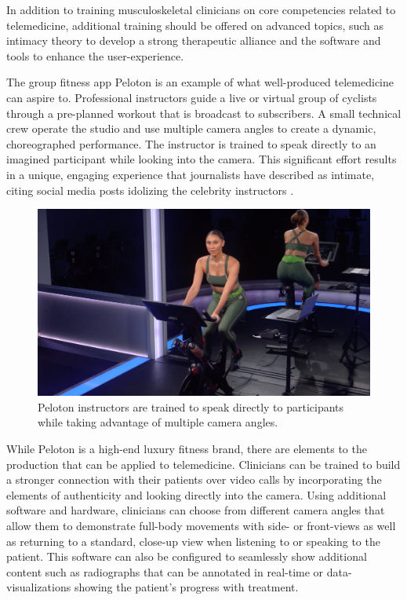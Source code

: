 \documentclass[utf8]{FrontiersinHarvard} %
\begin{document}
In addition to training musculoskeletal clinicians on core competencies related to telemedicine, additional training should be offered on advanced topics, such as intimacy theory to develop a strong therapeutic alliance and the software and tools to enhance the user-experience.

The group fitness app Peloton is an example of what well-produced telemedicine can aspire to. Professional instructors guide a live or virtual group of cyclists through a pre-planned workout that is broadcast to subscribers. A small technical crew operate the studio and use multiple camera angles to create a dynamic, choreographed performance. The instructor is trained to speak directly to an imagined participant while looking into the camera. This significant effort results in a unique, engaging experience that journalists have described as intimate, citing social media posts idolizing the celebrity instructors \citep{bryantTheresIntimacyWhat2020}.

\begin{figure}[!htbp]
\centering
\includegraphics[width=0.7\linewidth]{files/tgSYYIag2qhHH1yPOHt4-bbfcd88f98755d2c932ff8e793601c90.png}
\caption[]{Peloton instructors are trained to speak directly to participants while taking advantage of multiple camera angles.}
\label{zDL8HO3c8L}
\end{figure}

While Peloton is a high-end luxury fitness brand, there are elements to the production that can be applied to telemedicine. Clinicians can be trained to build a stronger connection with their patients over video calls by incorporating the elements of authenticity and looking directly into the camera. Using additional software and hardware, clinicians can choose from different camera angles that allow them to demonstrate full-body movements with side- or front-views as well as returning to a standard, close-up view when listening to or speaking to the patient. This software can also be configured to seamlessly show additional content such as radiographs that can be annotated in real-time or data-visualizations showing the patient's progress with treatment.
\end{document}
